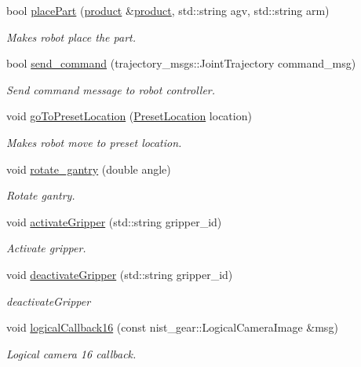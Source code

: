 \begin{DoxyCompactItemize}
bool \hyperlink{classGantryControl_a0d0eb41f65891a98cae6f2a4a42d281a}{place\+Part} (\hyperlink{utils_8h_a48a7207852c0455cce7e65703b12ec7e}{product} \&\hyperlink{utils_8h_a48a7207852c0455cce7e65703b12ec7e}{product}, std\+::string agv, std\+::string arm)
\begin{DoxyCompactList}\small\item\em Makes robot place the part. \end{DoxyCompactList}\item 
bool \hyperlink{classGantryControl_ab271ce06b0d336eddb26e1ba5a2ce594}{send\+\_\+command} (trajectory\+\_\+msgs\+::\+Joint\+Trajectory command\+\_\+msg)
\begin{DoxyCompactList}\small\item\em Send command message to robot controller. \end{DoxyCompactList}\item 
void \hyperlink{classGantryControl_a6986d4f622840037e003c6db840d78ed}{go\+To\+Preset\+Location} (\hyperlink{structPresetLocation}{Preset\+Location} location)
\begin{DoxyCompactList}\small\item\em Makes robot move to preset location. \end{DoxyCompactList}\item 
void \hyperlink{classGantryControl_ad7a304b37a95f29634631d4183276be3}{rotate\+\_\+gantry} (double angle)
\begin{DoxyCompactList}\small\item\em Rotate gantry. \end{DoxyCompactList}\item 
void \hyperlink{classGantryControl_aaccd9c43b5564c198288ba51cbcecabe}{activate\+Gripper} (std\+::string gripper\+\_\+id)
\begin{DoxyCompactList}\small\item\em Activate gripper. \end{DoxyCompactList}\item 
void \hyperlink{classGantryControl_a1485577d4e29baf708a4c5c028a47798}{deactivate\+Gripper} (std\+::string gripper\+\_\+id)
\begin{DoxyCompactList}\small\item\em deactivate\+Gripper \end{DoxyCompactList}\item 
void \hyperlink{classGantryControl_a9206feae49953cf691e0dec2331cc3ae}{logical\+Callback16} (const nist\+\_\+gear\+::\+Logical\+Camera\+Image \&msg)
\begin{DoxyCompactList}\small\item\em Logical camera 16 callback. \end{DoxyCompactList}\item 

\end{DoxyCompactItemize}
